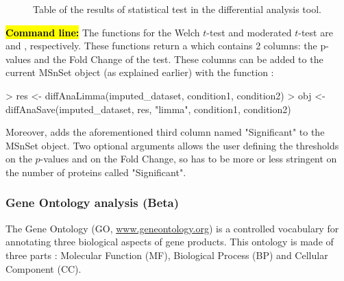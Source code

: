 \documentclass[12pt]{article}
\begin{document}
{\begin{figure}
\centering
{}
\caption{Table of the results of statistical test in the differential 
analysis tool.}\label{fig:anadiff4}
\end{figure}

\hl{\bf Command line:} The  functions for the Welch $t$-test 
and moderated $t$-test are  and 
, respectively. These functions return a 
 which contains 2 columns: the p-values and the Fold Change 
of the test. These columns can be added to the current MSnSet object 
 (as explained earlier) with the function 
:
\begin{Schunk}
\begin{Sinput}
> res <- diffAnaLimma(imputed_dataset, condition1, condition2)
> obj <- diffAnaSave(imputed_dataset, res, "limma", condition1, condition2)
\end{Sinput}
\end{Schunk}
Moreover,  adds the aforementioned third column 
named "Significant" to the MSnSet object. Two optional arguments allows the 
user defining the thresholds on the $p$-values and on the Fold Change, so has 
to be more or less stringent on the number of proteins called "Significant".


\subsubsection{Gene Ontology analysis (Beta)}\label{sec:GOAnalysis}

The Gene Ontology (GO, \url{www.geneontology.org}) is a controlled vocabulary for
annotating three biological aspects of gene products. This ontology is made of three 
parts : Molecular Function (MF), Biological Process (BP) and Cellular Component 
(CC). 

}
\end{document}
